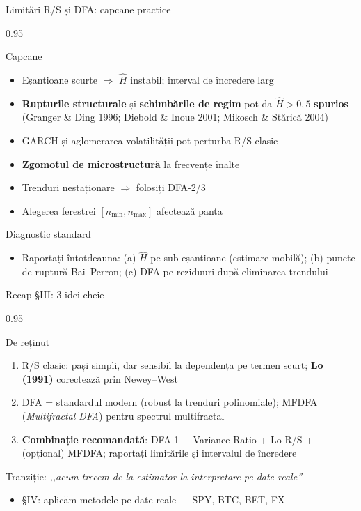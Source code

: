 \documentclass[9pt, aspectratio=169, t]{beamer}
\begin{document}
\begin{frame}[shrink=15]{Limitări R/S și DFA: capcane practice}
\begin{cminipage}{0.95\textwidth}
\begin{alertblock}{Capcane}
\begin{itemize}\setlength{\itemsep}{2pt}
    \item Eșantioane scurte $\Rightarrow$ $\hat{H}$ instabil; interval de încredere larg
    \item \textbf{Rupturile structurale} și \textbf{schimbările de regim} pot da $\hat{H}>0{,}5$ \textbf{spurios} (Granger \& Ding 1996; Diebold \& Inoue 2001; Mikosch \& Stărică 2004)
    \item GARCH și aglomerarea volatilității pot perturba R/S clasic
    \item \textbf{Zgomotul de microstructură} la frecvențe înalte
    \item Trenduri nestaționare $\Rightarrow$ folosiți DFA-2/3
    \item Alegerea ferestrei $[n_{\min},n_{\max}]$ afectează panta
\end{itemize}
\end{alertblock}
\begin{exampleblock}{Diagnostic standard}
\begin{itemize}\setlength{\itemsep}{0pt}
    \item Raportați întotdeauna: (a) $\hat H$ pe sub-eșantioane (estimare mobilă); (b) puncte de ruptură Bai--Perron; (c) DFA pe reziduuri după eliminarea trendului
\end{itemize}
\end{exampleblock}
\end{cminipage}
\end{frame}

\begin{frame}[shrink=15]{Recap §III: 3 idei-cheie}
\begin{cminipage}{0.95\textwidth}
\begin{block}{De reținut}
\begin{enumerate}\setlength{\itemsep}{4pt}
    \item R/S clasic: pași simpli, dar sensibil la dependența pe termen scurt; \textbf{Lo (1991)} corectează prin Newey--West
    \item DFA = standardul modern (robust la trenduri polinomiale); MFDFA (\textit{Multifractal DFA}) pentru spectrul multifractal
    \item \textbf{Combinație recomandată}: DFA-1 + Variance Ratio + Lo R/S + (opțional) MFDFA; raportați limitările și intervalul de încredere
\end{enumerate}
\end{block}
\begin{exampleblock}{Tranziție: \textit{,,acum trecem de la estimator la interpretare pe date reale''}}
\begin{itemize}\setlength{\itemsep}{0pt}
    \item §IV: aplicăm metodele pe date reale --- SPY, BTC, BET, FX
\end{itemize}
\end{exampleblock}
\end{cminipage}
\end{frame}
\end{document}
